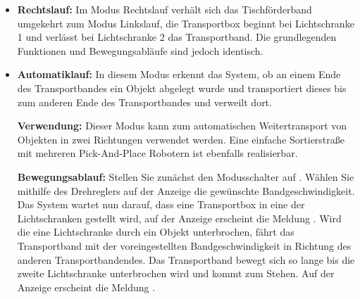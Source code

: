 \begin{itemize}
\begin{itemize}
		\textbf{Bewegungsablauf:}
		Stellen Sie zunächst den Modusschalter auf .
		Wählen Sie mithilfe des Drehreglers auf der Anzeige die gewünschte Bandgeschwindigkeit.
		Das System wartet nun darauf, dass eine Transportbox in Lichtschranke 2 gestellt wird, auf der Anzeige erscheint die Meldung .
		Wird eine Transportbox erkannt, wartet das System 2 Sekunden und beschleunigt dann auf die eingestellte Bandgeschwindigkeit.
		Das Transportband fährt solange, bis die Transportbox die Lichtschranke 1 passiert hat und dadurch erkennt, dass Sie das Transportband verlassen hat.
		
		Sollte das Objekt die  Lichtschranke 1 innerhalb eines festgesetzten Zeitraumes von maximal 30 Sekunden nicht erreichen, hält das Transportband selbstständig an. Auf der Anzeige erscheint der Fehlercode .
		
		\item \textbf{Rechtslauf:}
		Im Modus Rechtslauf verhält sich das Tischförderband umgekehrt zum Modus Linkslauf, die Transportbox beginnt bei Lichtschranke 1 und verlässt bei Lichtschranke 2 das Transportband. 
		Die grundlegenden Funktionen und Bewegungsabläufe sind jedoch identisch.
		
		\item \textbf{Automatiklauf:}
		In diesem Modus erkennt das System, ob an einem Ende des Transportbandes ein Objekt abgelegt wurde und transportiert dieses bis zum anderen Ende des Transportbandes und verweilt dort.
		
		\textbf{Verwendung:}
		Dieser Modus kann zum automatischen Weitertransport von Objekten in zwei Richtungen verwendet werden. Eine einfache Sortierstraße mit mehreren Pick-And-Place Robotern ist ebenfalls realisierbar.
		
		\textbf{Bewegungsablauf:}
		Stellen Sie zunächst den Modusschalter auf .
		Wählen Sie mithilfe des Drehreglers auf der Anzeige die gewünschte Bandgeschwindigkeit.
		Das System wartet nun darauf, dass eine Transportbox in eine der Lichtschranken gestellt wird, auf der Anzeige erscheint die Meldung .
		Wird die eine Lichtschranke durch ein Objekt unterbrochen, fährt das Transportband mit der voreingestellten Bandgeschwindigkeit in Richtung des anderen Transportbandendes. 
		Das Transportband bewegt sich so lange bis die zweite Lichtschranke unterbrochen wird und kommt zum Stehen. Auf der Anzeige erscheint die Meldung .\\
		

\end{itemize}
\end{itemize}
